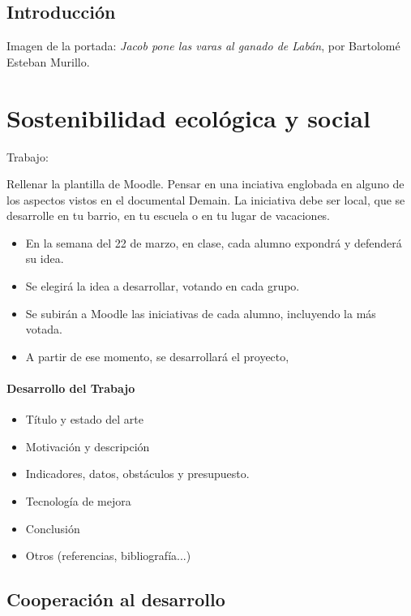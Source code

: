 \documentclass[a4paper]{book}
\begin{document}
\newpage
{}
{}
\section*{Introducción}
Imagen de la portada: \textsl{Jacob pone las varas al ganado de Labán}, por Bartolomé Esteban Murillo.
\newpage

\setlength{\parskip}{0em}
\tableofcontents
\setlength{\parskip}{0.5em}

\chapter{Sostenibilidad ecológica y social}

Trabajo:

Rellenar la plantilla de Moodle. Pensar en una inciativa englobada en alguno de los aspectos vistos en el documental Demain. La iniciativa debe ser local, que se desarrolle en tu barrio, en tu escuela o en tu lugar de vacaciones.

\begin{itemize}
	\item En la semana del 22 de marzo, en clase, cada alumno expondrá y defenderá su idea.
	\item Se elegirá la idea a desarrollar, votando en cada grupo.
	\item Se subirán a Moodle las iniciativas de cada alumno, incluyendo la más votada.
	\item A partir de ese momento, se desarrollará el proyecto,
\end{itemize}

\subsubsection{Desarrollo del Trabajo}
\begin{itemize}
	\item Título y estado del arte
	\item Motivación y descripción
	\item Indicadores, datos, obstáculos y presupuesto.
	\item Tecnología de mejora
	\item Conclusión
	\item Otros (referencias, bibliografía...)
\end{itemize}


\section{Cooperación al desarrollo}
\end{document}
